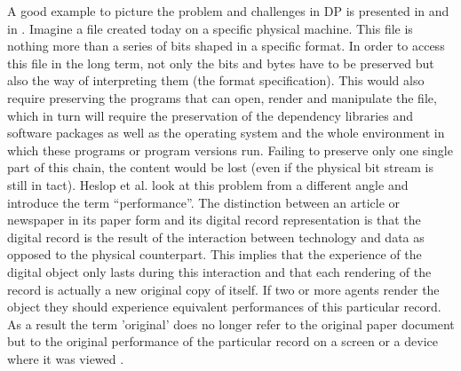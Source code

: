 A good example to picture the problem and challenges in DP is presented in \cite{Lorie:2001:LTP:379437.379726} and in \cite{Rauber:2009:dpchallenges}. Imagine a file created today on a specific physical machine. This file is nothing more than a series of bits shaped in a specific format. In order to access this file in the long term, not only the bits and bytes have to be preserved but also the way of interpreting them (the format specification). This would also require preserving the programs that can open, render and manipulate the file, which in turn will require the preservation of the dependency libraries and software packages as well as the operating system and the whole environment in which these programs or program versions run. Failing to preserve only one single part of this chain, the content would be lost (even if the physical bit stream is still in tact). Heslop et al. look at this problem from a different angle and introduce the term ``performance''. The distinction between an article or newspaper in its paper form and its digital record representation is that the digital record is the result of the interaction between technology and data as opposed to the physical counterpart. This implies that the experience of the digital object only lasts during this interaction and that each rendering of the record is actually a new original copy of itself. If two or more agents render the object they should experience equivalent performances of this particular record. As a result the term 'original' does no longer refer to the original paper document but to the original performance of the particular record on a screen or a device where it was viewed \cite{nla.cat-vn3423702}.

